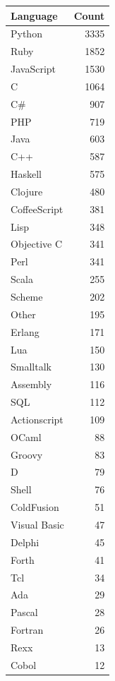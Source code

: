 \begin{tabular}{l r}
Language     & Count \\ \hline\hline
Python       & 3335 \\ \hline
Ruby         & 1852 \\ \hline
JavaScript   & 1530 \\ \hline
C            & 1064 \\ \hline
C\#          & 907 \\ \hline
PHP          & 719 \\ \hline
Java         & 603 \\ \hline
C++          & 587 \\ \hline
Haskell      & 575 \\ \hline
Clojure      & 480 \\ \hline
CoffeeScript & 381 \\ \hline
Lisp         & 348 \\ \hline
Objective C  & 341 \\ \hline
Perl         & 341 \\ \hline
Scala        & 255 \\ \hline
Scheme       & 202 \\ \hline
Other        & 195 \\ \hline
Erlang       & 171 \\ \hline
Lua          & 150 \\ \hline
Smalltalk    & 130 \\ \hline
Assembly     & 116 \\ \hline
SQL          & 112 \\ \hline
Actionscript & 109 \\ \hline
OCaml        & 88 \\ \hline
Groovy       & 83 \\ \hline
D            & 79 \\ \hline
Shell        & 76 \\ \hline
ColdFusion   & 51 \\ \hline
Visual Basic & 47 \\ \hline
Delphi       & 45 \\ \hline
Forth        & 41 \\ \hline
Tcl          & 34 \\ \hline
Ada          & 29 \\ \hline
Pascal       & 28 \\ \hline
Fortran      & 26 \\ \hline
Rexx         & 13 \\ \hline
Cobol        & 12 \\ \hline
\end{tabular}